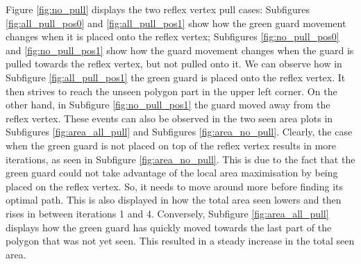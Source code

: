 Figure \ref{fig:no_pull} displays the two reflex vertex pull cases: Subfigures \ref{fig:all_pull_pos0} and \ref{fig:all_pull_pos1} show how the green guard movement changes when it is placed onto the reflex vertex; Subfigures \ref{fig:no_pull_pos0} and \ref{fig:no_pull_pos1} show how the guard movement changes when the guard is pulled towards the reflex vertex, but not pulled onto it. We can observe how in Subfigure \ref{fig:all_pull_pos1} the green guard is placed onto the reflex vertex. It then strives to reach the unseen polygon part in the upper left corner. On the other hand, in Subfigure \ref{fig:no_pull_pos1} the guard moved away from the reflex vertex. 
These events can also be observed in the two seen area plots in Subfigures \ref{fig:area_all_pull} and Subfigures \ref{fig:area_no_pull}. Clearly, the case when the green guard is not placed on top of the reflex vertex results in more iterations, as seen in Subfigure \ref{fig:area_no_pull}. This is due to the fact that the green guard could not take advantage of the local area maximisation by being placed on the reflex vertex. So, it needs to move around more before finding its optimal path. This is also displayed in how the total area seen lowers and then rises in between iterations 1 and 4. Conversely, Subfigure \ref{fig:area_all_pull} displays how the green guard has quickly moved towards the last part of the polygon that was not yet seen. This resulted in a steady increase in the total seen area.


